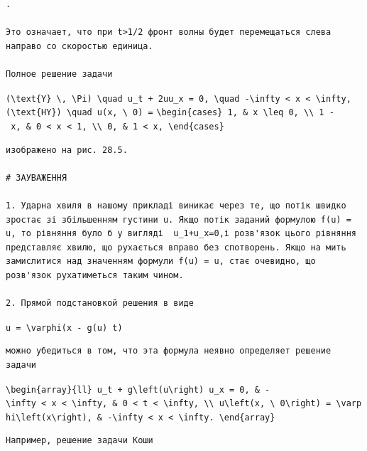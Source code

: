 \documentclass[
  ukrainian,
]{article}
\begin{document}
\begin{verbatim}
.

Это означает, что при t>1/2 фронт волны будет перемещаться слева направо со скоростью единица.

Полное решение задачи
\end{verbatim}

\texttt{(\textbackslash{}text\{Y\}\ \textbackslash{},\ \textbackslash{}Pi)\ \textbackslash{}quad\ u\_t\ +\ 2uu\_x\ =\ 0,\ \textbackslash{}quad\ -\textbackslash{}infty\ \textless{}\ x\ \textless{}\ \textbackslash{}infty,}
\texttt{(\textbackslash{}text\{HY\})\ \textbackslash{}quad\ u(x,\ \textbackslash{}\ 0)\ =}
\texttt{\textbackslash{}begin\{cases\}\ 1,\ \&\ x\ \textbackslash{}leq\ 0,\ \textbackslash{}\textbackslash{}\ 1\ -\ x,\ \&\ 0\ \textless{}\ x\ \textless{}\ 1,\ \textbackslash{}\textbackslash{}\ 0,\ \&\ 1\ \textless{}\ x,\ \textbackslash{}end\{cases\}}

\begin{verbatim}
изображено на рис. 28.5.

# ЗАУВАЖЕННЯ

1. Ударна хвиля в нашому прикладі виникає через те, що потік швидко зростає зі збільшенням густини u. Якщо потік заданий формулою f(u) = u, то рівняння було б у вигляді  u_1+u_x=0,і розв'язок цього рівняння представляє хвилю, що рухається вправо без спотворень. Якщо на мить замислитися над значенням формули f(u) = u, стає очевидно, що розв'язок рухатиметься таким чином.

2. Прямой подстановкой решения в виде
\end{verbatim}

\texttt{u\ =\ \textbackslash{}varphi(x\ -\ g(u)\ t)}

\begin{verbatim}
можно убедиться в том, что эта формула неявно определяет решение задачи
\end{verbatim}

\texttt{\textbackslash{}begin\{array\}\{ll\}\ u\_t\ +\ g\textbackslash{}left(u\textbackslash{}right)\ u\_x\ =\ 0,\ \&\ -\textbackslash{}infty\ \textless{}\ x\ \textless{}\ \textbackslash{}infty,\ \&\ 0\ \textless{}\ t\ \textless{}\ \textbackslash{}infty,\ \textbackslash{}\textbackslash{}\ u\textbackslash{}left(x,\ \textbackslash{}\ 0\textbackslash{}right)\ =\ \textbackslash{}varphi\textbackslash{}left(x\textbackslash{}right),\ \&\ -\textbackslash{}infty\ \textless{}\ x\ \textless{}\ \textbackslash{}infty.\ \textbackslash{}end\{array\}}

\begin{verbatim}
Например, решение задачи Коши
\end{verbatim}
\end{document}
